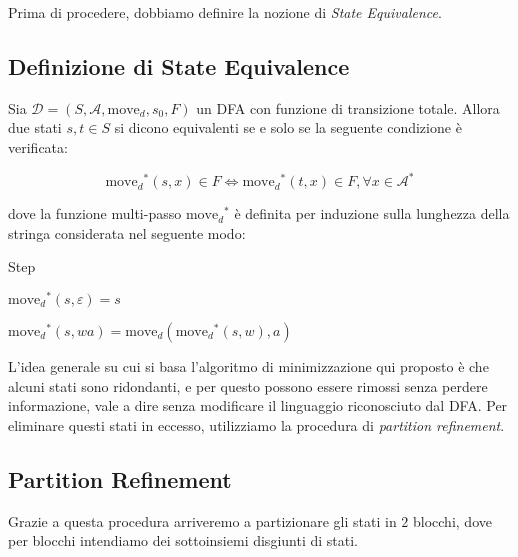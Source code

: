 \documentclass[class=book, crop=false, oneside, 12pt]{standalone}
\begin{document}
Prima di procedere, dobbiamo definire la nozione di \emph{State Equivalence}.

\subsection{Definizione di State Equivalence}
\begin{definition}
    Sia \(\mathcal{D} = (S,\mathcal{A},\textrm{move}_{d},s_{0},F)\) un DFA con funzione di transizione totale. Allora due stati \(s,t \in S\) si dicono equivalenti se e solo se la seguente condizione è verificata:

    \begin{equation}
        \textrm{move}_{d}\!^{*}(s,x) \in F \iff \textrm{move}_{d}\!^{*}(t,x) \in F,  \forall x \in \mathcal{A}^{*} 
    \end{equation}
    
    \noindent dove la funzione multi-passo \(\textrm{move}_{d}\!^{*}\) è definita per induzione sulla lunghezza della stringa considerata nel seguente modo:

    \begin{labeling}{Step}
        \item[Base] \(\textrm{move}_{d}\!^{*}(s,\varepsilon)=s\) 
        \item[Step] \(\textrm{move}_{d}\!^{*}(s,wa)= \textrm{move}_{d}(\textrm{move}_{d}\!^{*}(s,w),a)\)
    \end{labeling}    
\end{definition}

L'idea generale su cui si basa l'algoritmo di minimizzazione qui proposto è che alcuni stati sono ridondanti, e per questo possono essere rimossi senza perdere informazione, vale a dire senza modificare il linguaggio riconosciuto dal DFA. Per eliminare questi stati in eccesso, utilizziamo la procedura di \emph{partition refinement}.

\subsection{Partition Refinement}
Grazie a questa procedura arriveremo a partizionare gli stati in \(2\) blocchi, dove per blocchi intendiamo dei sottoinsiemi disgiunti di stati.
\end{document}
